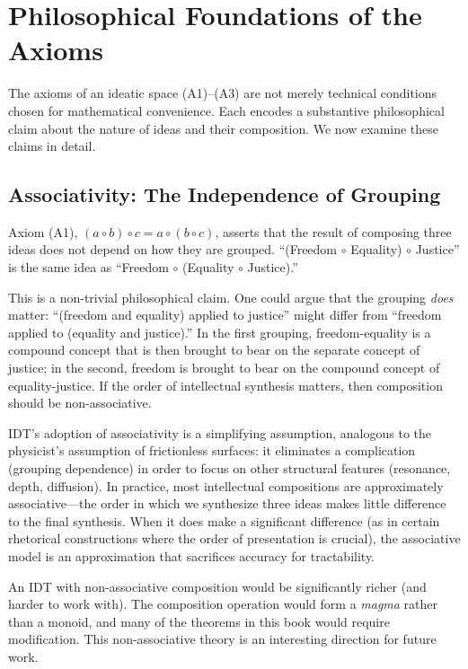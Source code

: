 \documentclass[11pt,openany]{book}
\theoremstyle{definition}
\theoremstyle{plain}
\theoremstyle{remark}
\newcommand{\compose}{\circ}                 %
\begin{document}
\section{Philosophical Foundations of the Axioms}

The axioms of an ideatic space (A1)--(A3) are not merely technical conditions chosen for mathematical convenience. Each encodes a substantive philosophical claim about the nature of ideas and their composition. We now examine these claims in detail.

\subsection{Associativity: The Independence of Grouping}

Axiom (A1), $(a \compose b) \compose c = a \compose (b \compose c)$, asserts that the result of composing three ideas does not depend on how they are grouped. ``(Freedom $\compose$ Equality) $\compose$ Justice'' is the same idea as ``Freedom $\compose$ (Equality $\compose$ Justice).''

This is a non-trivial philosophical claim. One could argue that the grouping \emph{does} matter: ``(freedom and equality) applied to justice'' might differ from ``freedom applied to (equality and justice).'' In the first grouping, freedom-equality is a compound concept that is then brought to bear on the separate concept of justice; in the second, freedom is brought to bear on the compound concept of equality-justice. If the order of intellectual synthesis matters, then composition should be non-associative.

IDT's adoption of associativity is a simplifying assumption, analogous to the physicist's assumption of frictionless surfaces: it eliminates a complication (grouping dependence) in order to focus on other structural features (resonance, depth, diffusion). In practice, most intellectual compositions are approximately associative---the order in which we synthesize three ideas makes little difference to the final synthesis. When it does make a significant difference (as in certain rhetorical constructions where the order of presentation is crucial), the associative model is an approximation that sacrifices accuracy for tractability.

An IDT with non-associative composition would be significantly richer (and harder to work with). The composition operation would form a \emph{magma} rather than a monoid, and many of the theorems in this book would require modification. This non-associative theory is an interesting direction for future work.
\end{document}
